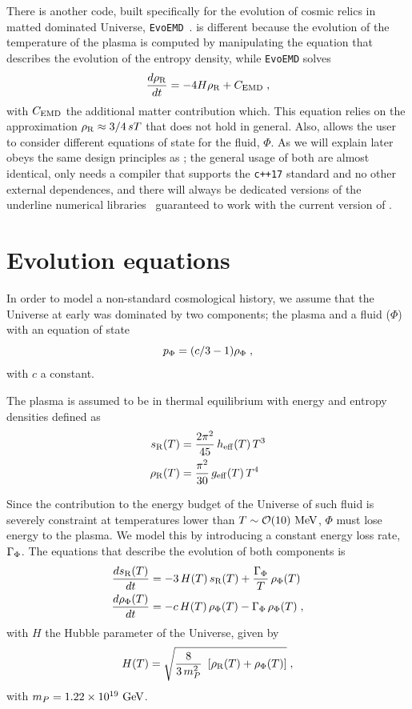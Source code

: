 \documentclass[11pt,a4paper]{article}
\begin{document}
There is another code, built specifically for the evolution of cosmic relics in matted dominated Universe, {\tt EvoEMD}~\cite{Dutra:2021phm}. \nsc is different because the evolution of the temperature of the plasma is computed by manipulating the equation that describes the evolution of the entropy density, while {\tt EvoEMD} solves
%
\begin{equation}
	\dfrac{d\rho_{\rm R}}{dt} = -4H\rho_{\rm R} + C_{\rm EMD} \;,
	\label{eq:EvoMD}
\end{equation}
%
with  $C_{\rm EMD}$ the additional matter contribution which. This equation relies on the approximation $\rho_{\rm R} \approx 3/4 \, sT$ that does not hold in general. Also, \nsc allows the user to consider different equations of state for the fluid, $\Phi$. 
%
As we will explain later \nsc obeys the same design principles as \mimes; \ie the general usage of both are almost identical, \nsc only needs a \CPP compiler that supports the {\tt c++17} standard and no other external dependences, and there will always be dedicated versions of the underline numerical libraries~\cite{NaBBODES,SimpleSplines} guaranteed to work with the current version of \nsc.



\section{Evolution equations}\label{sec:equations}
\setcounter{equation}{0}

In order to model a non-standard cosmological history, we assume that the Universe at early was dominated by two components; the plasma and a fluid ($\Phi$) with an equation of state
%
\begin{equation}
	p_{\Phi} = (c/3-1) \rho_{\Phi} \;,
	\label{eq:EOS}
\end{equation}  
%
with $c$ a constant. 

The plasma is assumed to be in thermal equilibrium with energy and entropy densities defined as
%
\begin{align}
	s_{\rm R}(T)&=\dfrac{2\pi^2}{45} \,  h_{\rm eff}{}(T) \, T^3 \label{eq:s_def}\\
	\rho_{\rm R}(T)&=\dfrac{\pi^2}{30} \,  g_{\rm eff}{}(T) \, T^4 \label{eq:rho_def}
\end{align}
%


Since the contribution to the energy budget of the Universe of such fluid is severely constraint at temperatures lower than $T \sim \mathcal{O}(10)~{\rm MeV}$, $\Phi$ must lose energy to the plasma. We model this by introducing a constant energy loss rate, $\Gamma_{\Phi}$. The equations that describe the evolution of both components is
%
\begin{align}
	\dfrac{ds_{\rm R}(T)}{dt} &= -3 \, H(T)  \, s_{\rm R}(T) + \dfrac{\Gamma_{\Phi}}{T} \, \rho_{\Phi}(T) \label{eq:dsdt} \\ 
	\dfrac{d\rho_{\Phi}(T)}{dt} &= - c \, H(T) \, \rho_{\Phi}(T) - \Gamma_{\Phi} \, \rho_{\Phi}(T) \label{eq:drhoPhidt} \;,
\end{align}
%
with $H$ the Hubble parameter of the Universe, given by
%
\begin{equation}
	H(T) = \sqrt{\dfrac{8}{3\,m_P^2} \ \left[ \rho_{\rm R}(T) + \rho_{\Phi}(T) \right]}\;,
	\label{eq:H_def}
\end{equation}
%
with $m_P = 1.22 \times 10^{19}~{\rm GeV}$.
 
\end{document}

